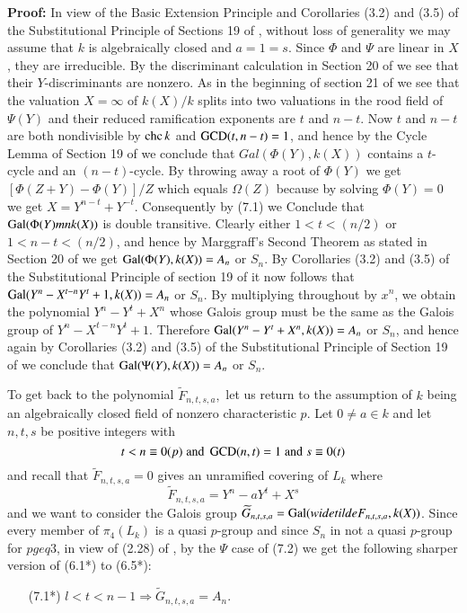 \noindent
\textbf{Proof:} In view of the Basic Extension Principle and Corollaries (3.2) and (3.5) of the Substitutional Principle of Sections 19 of \cite{art1-key8}, without loss of generality we may assume that $k$ is algebraically closed and $a=1 =s$. Since $\Phi$ and $\Psi$ are linear in $X$, they are irreducible. By the discriminant calculation in Section 20 of \cite{art1-key8} we see that their $Y$-discriminants are nonzero. As in the beginning of section 21 of \cite{art1-key8} we see that the valuation $X=\infty$ of $k(X)/k$ splits into two valuations in the rood field of $\Psi(Y)$ and their reduced  ramification exponents are $t$ and $n-t$. Now $t$ and $n-t$ are both nondivisible by $\operatorname{chc} k$ and $\operatorname{GCD}(t,n-t)=1$, and hence by the Cycle Lemma of Section 19 of \cite{art-key8} we conclude that $Gal(\Phi(Y), k(X))$ contains a $t$-cycle and an $(n-t)$-cycle. By throwing away a root of $\Phi(Y)$ we get $\left[\Phi(Z+Y)-\Phi(Y)\right]/Z$ which equals $\Omega(Z)$ because by solving $\Phi(Y)=0$ we get $X=Y^{n-t}+Y^{-t}$. Consequently by (7.1) we Conclude that $\operatorname{Gal}(\Phi(Y)mn k(X))$ is double transitive. Clearly either $1<t<(n/2)$ or $1<n-t<(n/2)$, and hence by Marggraff's Second Theorem as stated in Section 20 of \cite{art1-key8} we get $\operatorname{Gal}(\Phi(Y), k(X)) = A_{n}$ or $S_{n}$. By Corollaries (3.2) and (3.5) of the Substitutional Principle of section 19 of \cite{art1-key8} it now follows that $\operatorname{Gal}(Y^{n}-X^{t-n}Y^{t}+1, k(X))=A_{n}$ or $S_{n}$. By multiplying throughout by $x^{n}$, we obtain the polynomial $Y^{n}-Y^{t}+X^{n}$ whose Galois group must be the same as the Galois group of $Y^{n}-X^{t-n}Y^{t}+1$. Therefore $\operatorname{Gal}(Y^{n}-Y^{t}+X^{n}, k(X))=A_{n}$ or $S_{n}$, and hence again by Corollaries (3.2) and (3.5) of the Substitutional Principle of Section 19 of \cite{art1-key8} we conclude that $\operatorname{Gal}(\Psi(Y), k(X)) =A_{n}$ or $S_{n}$.  

To get back to the polynomial $\widetilde{F}_{n,t,s,a},$ let us return to the assumption of $k$ being an algebraically closed field of nonzero characteristic $p$. Let $0\neq a \in k$ and let $n, t, s$ be positive integers with
$$
t < n \equiv 0(p)\; {\rm and}\; \operatorname{GCD}(n,t) = 1\; {\rm and}\; s\equiv 0(t)
$$
and recall that $\widetilde{F}_{n,t,s,a} = 0$ gives an unramified covering of $L_{k}$ where
$$
\widetilde{F}_{n,t,s,a} =Y^{n}-aY^{t}+X^{s}
$$
and we want to consider the Galois group $\widetilde{G}_{n,t,s,a} = \operatorname{Gal}(widetilde{F}_{n,t,s,a}, k(X))$. Since every member of $\pi_{4}(L_{k})$ is a quasi $p$-group and since $S_{n}$ in not a quasi $p$-group for $p geq 3$, in view of (2.28) of \cite{art1-key14}, by the $\Psi$ case of (7.2) we get the following sharper version of (6.1*) to (6.5*):
\begin{itemize}
\item[{\rm (7.1*)}] $l < t < n-1 \Rightarrow \widetilde{G}_{n,t,s,a} =A_{n}$.
\end{itemize}

